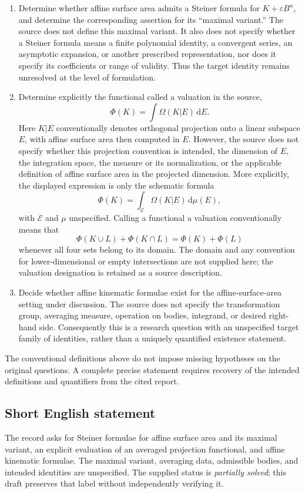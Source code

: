 \documentclass[11pt]{article}
\begin{document}
\begin{enumerate}
\item Determine whether affine surface area admits a Steiner formula for \(K+\varepsilon B^n\), and determine the corresponding assertion for its ``maximal variant.'' The source does not define this maximal variant. It also does not specify whether a Steiner formula means a finite polynomial identity, a convergent series, an asymptotic expansion, or another prescribed representation, nor does it specify its coefficients or range of validity. Thus the target identity remains unresolved at the level of formulation.
\item Determine explicitly the functional called a valuation in the source,
\[
\Phi(K)=\int\Omega(K|E)\,\mathrm{d}E.
\]
Here \(K|E\) conventionally denotes orthogonal projection onto a linear subspace \(E\), with affine surface area then computed in \(E\). However, the source does not specify whether this projection convention is intended, the dimension of \(E\), the integration space, the measure or its normalization, or the applicable definition of affine surface area in the projected dimension. More explicitly, the displayed expression is only the schematic formula
\[
\Phi(K)=\int_{\mathcal E}\Omega(K|E)\,\mathrm{d}\mu(E),
\]
with \(\mathcal E\) and \(\mu\) unspecified. Calling a functional a valuation conventionally means that
\[
\Phi(K\cup L)+\Phi(K\cap L)=\Phi(K)+\Phi(L)
\]
whenever all four sets belong to its domain. The domain and any convention for lower-dimensional or empty intersections are not supplied here; the valuation designation is retained as a source description.
\item Decide whether affine kinematic formulae exist for the affine-surface-area setting under discussion. The source does not specify the transformation group, averaging measure, operation on bodies, integrand, or desired right-hand side. Consequently this is a research question with an unspecified target family of identities, rather than a uniquely quantified existence statement.
\end{enumerate}

The conventional definitions above do not impose missing hypotheses on the original questions. A complete precise statement requires recovery of the intended definitions and quantifiers from the cited report.
\subsection{Short English statement}
The record asks for Steiner formulae for affine surface area and its maximal variant, an explicit evaluation of an averaged projection functional, and affine kinematic formulae. The maximal variant, averaging data, admissible bodies, and intended identities are unspecified. The supplied status is \emph{partially solved}; this draft preserves that label without independently verifying it.
\end{document}
